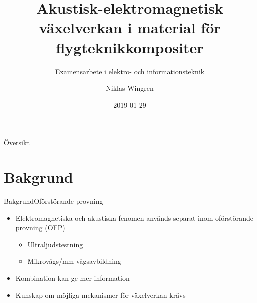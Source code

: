 \documentclass[11pt, final]{beamer}
\begin{document}
	
	\newcommand{\mrm}[1]{\mathrm{#1}}
	\newcommand{\eu}{\mrm{e}}
	\newcommand{\iu}{\mrm{i}}	
	
	\author{Niklas Wingren}
	\title[Akusto-elektromagnetisk växelverkan]{Akustisk-elektromagnetisk växelverkan i material för flygteknikkompositer}
	\subtitle{Examensarbete i elektro- och informationsteknik}
	\date{2019-01-29}
	\frame[plain]{\maketitle}
	
	\begin{frame}{Översikt}
		\tableofcontents
	\end{frame}
	
	
	\section{Bakgrund}
	
	\begin{frame}{Bakgrund}{Oförstörande provning}
		\begin{itemize}
			\item Elektromagnetiska och akustiska fenomen används separat inom oförstörande provning (OFP)
			\begin{itemize}
				\pause
				\item Ultraljudstestning
				\item Mikrovågs/mm-vågsavbildning
			\end{itemize}
			\pause
			\item Kombination kan ge mer information
			\pause
			\item Kunskap om möjliga mekanismer för växelverkan krävs
		\end{itemize}
	\end{frame}
	
\end{document}
